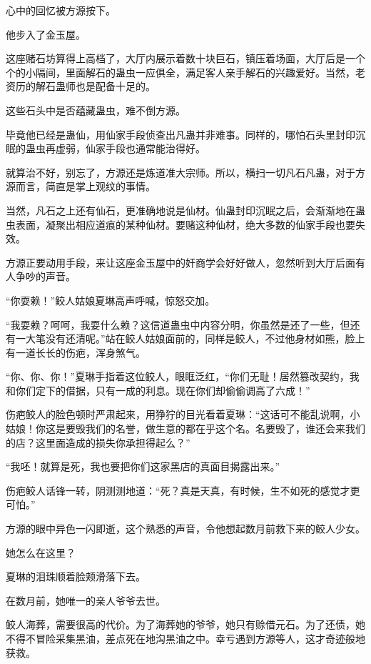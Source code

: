 
\begin{this_body}



心中的回忆被方源按下。

他步入了金玉屋。

这座赌石坊算得上高档了，大厅内展示着数十块巨石，镇压着场面，大厅后是一个个的小隔间，里面解石的蛊虫一应俱全，满足客人亲手解石的兴趣爱好。当然，老资历的解石蛊师也是配备十足的。

这些石头中是否蕴藏蛊虫，难不倒方源。

毕竟他已经是蛊仙，用仙家手段侦查出凡蛊并非难事。同样的，哪怕石头里封印沉眠的蛊虫再虚弱，仙家手段也通常能治得好。

就算治不好，别忘了，方源还是炼道准大宗师。所以，横扫一切凡石凡蛊，对于方源而言，简直是掌上观纹的事情。

当然，凡石之上还有仙石，更准确地说是仙材。仙蛊封印沉眠之后，会渐渐地在蛊虫表面，凝聚出相应道痕的某种仙材。要赌这种仙材，绝大多数的仙家手段也要失效。

方源正要动用手段，来让这座金玉屋中的奸商学会好好做人，忽然听到大厅后面有人争吵的声音。

“你耍赖！”鲛人姑娘夏琳高声呼喊，惊怒交加。

“我耍赖？呵呵，我耍什么赖？这信道蛊虫中内容分明，你虽然是还了一些，但还有一大笔没有还清呢。”站在鲛人姑娘面前的，同样是鲛人，不过他身材如熊，脸上有一道长长的伤疤，浑身煞气。

“你、你、你！”夏琳手指着这位鲛人，眼眶泛红，“你们无耻！居然篡改契约，我和你们定下的借据，只有一成的利息。现在你们却偷偷调高了六成！”

伤疤鲛人的脸色顿时严肃起来，用狰狞的目光看着夏琳：“这话可不能乱说啊，小姑娘！你这是要毁我们的名誉，做生意的都在乎这个名。名要毁了，谁还会来我们的店？这里面造成的损失你承担得起么？”

“我呸！就算是死，我也要把你们这家黑店的真面目揭露出来。”

伤疤鲛人话锋一转，阴测测地道：“死？真是天真，有时候，生不如死的感觉才更可怕。”

方源的眼中异色一闪即逝，这个熟悉的声音，令他想起数月前救下来的鲛人少女。

她怎么在这里？

夏琳的泪珠顺着脸颊滑落下去。

在数月前，她唯一的亲人爷爷去世。

鲛人海葬，需要很高的代价。为了海葬她的爷爷，她只有赊借元石。为了还债，她不得不冒险采集黑油，差点死在地沟黑油之中。幸亏遇到方源等人，这才奇迹般地获救。


\end{this_body}
